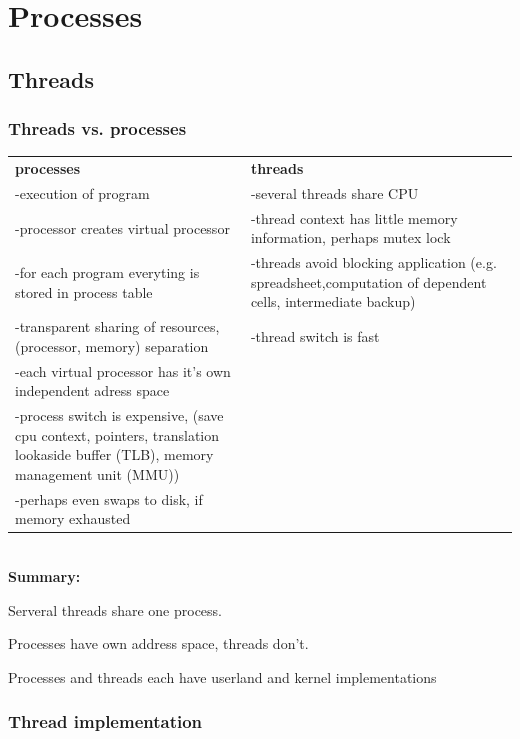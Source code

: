 \chapter{Processes}

\section{Threads}

\subsection{Threads vs. processes}

\begin{tabular}{p{7cm} p{7cm}}
\textbf{processes}			&\textbf{threads}\\
-execution of program			&-several threads share CPU\\
-processor creates virtual processor	&-thread context has little memory information, perhaps mutex lock\\
-for each program everyting is stored in process table	&-threads avoid blocking application (e.g. spreadsheet,computation of dependent cells, intermediate backup)\\
-transparent sharing of resources,(processor, memory) separation&-thread switch is fast\\
-each virtual processor has it's own independent adress space & \ \\
-process switch is expensive, (save cpu context, pointers, translation lookaside buffer (TLB), memory management unit (MMU)) & \ \\
-perhaps even swaps to disk, if memory exhausted & \ \\
\end{tabular}

\ \\

\textbf{Summary:}
\begin{compactitem}
	\item Serveral threads share one process.
	\item Processes have own address space, threads don't.
	\item Processes and threads each have userland and kernel implementations
\end{compactitem}

\subsection{Thread implementation}

